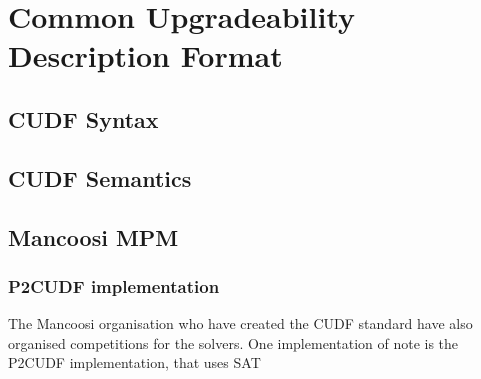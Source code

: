 \section{Common Upgradeability Description Format}
\label{background.cudf}

{}\cite{treinen2009common}



\subsection{CUDF Syntax}




\subsection{CUDF Semantics}




\subsection{Mancoosi MPM}


\subsubsection{P2CUDF implementation}
The Mancoosi organisation who have created the CUDF standard have also organised competitions for the solvers.
One implementation of note is the P2CUDF implementation, that uses SAT


